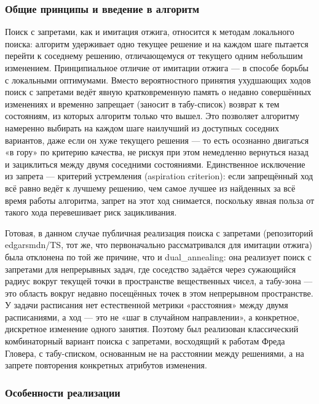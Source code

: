  
\subsubsection { Общие принципы и введение в алгоритм}

Поиск с запретами, как и имитация отжига, относится к методам локального поиска: алгоритм удерживает одно текущее решение и на каждом шаге пытается перейти к соседнему решению, отличающемуся от текущего одним небольшим изменением. Принципиальное отличие от имитации отжига — в способе борьбы с локальными оптимумами. Вместо вероятностного принятия ухудшающих ходов поиск с запретами ведёт явную кратковременную память о недавно совершённых изменениях и временно запрещает (заносит в табу-список) возврат к тем состояниям, из которых алгоритм только что вышел. Это позволяет алгоритму намеренно выбирать на каждом шаге наилучший из доступных соседних вариантов, даже если он хуже текущего решения — то есть осознанно двигаться «в гору» по критерию качества, не рискуя при этом немедленно вернуться назад и зациклиться между двумя соседними состояниями. Единственное исключение из запрета — критерий устремления (aspiration criterion): если запрещённый ход всё равно ведёт к лучшему решению, чем самое лучшее из найденных за всё время работы алгоритма, запрет на этот ход снимается, поскольку явная польза от такого хода перевешивает риск зацикливания.
 
Готовая, в данном случае публичная реализация поиска с запретами (репозиторий edgarsmdn/TS, тот же, что первоначально рассматривался для имитации отжига) была отклонена по той же причине, что и dual_annealing: она реализует поиск с запретами для непрерывных задач, где соседство задаётся через сужающийся радиус вокруг текущей точки в пространстве вещественных чисел, а табу-зона — это область вокруг недавно посещённых точек в этом непрерывном пространстве. У задачи расписания нет естественной метрики «расстояния» между двумя расписаниями, а ход — это не «шаг в случайном направлении», а конкретное, дискретное изменение одного занятия. Поэтому был реализован классический комбинаторный вариант поиска с запретами, восходящий к работам Фреда Гловера, с табу-списком, основанным не на расстоянии между решениями, а на запрете повторения конкретных атрибутов изменения.

\subsubsection { Особенности реализации}

